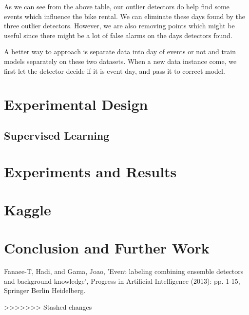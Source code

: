 \documentclass[12pt]{article}
\begin{document}
 	As we can see from the above table, our outlier detectors do help find some events which influence the bike rental. We can eliminate these days found by the three outlier detectors. However, we are also removing points which might be useful since there might be a lot of false alarms on the days detectors found.  
 	
 	A better way to approach is separate data into day of events or not and train models separately on these two datasets. When a new data instance come, we first let the detector decide if it is event day, and pass it to correct model.
	
\section{Experimental Design}
	\label{sec:experimental-design}
	
	
	
\subsection{Supervised Learning}
	\label{supervised learning}
	
	
\section{Experiments and Results}
	\label{sec:experiments-and-results}
	
\section{Kaggle}
	
	
\section{Conclusion and Further Work}
	\label{sec:conclusion}
	
	
	
\begin{thebibliography}{9}
		Fanaee-T, Hadi, and Gama, Joao, 'Event labeling combining ensemble detectors and background knowledge', Progress in Artificial Intelligence (2013): pp. 1-15, Springer Berlin Heidelberg.
	\end{thebibliography}
	
	>>>>>>> Stashed changes
\end{document}
